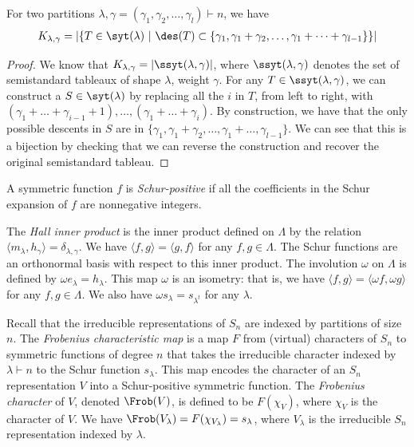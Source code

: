  \begin{prop}
     For two partitions $\lambda,\gamma = (\gamma_1,\gamma_2,\dots, \gamma_l)\vdash n$, we have
      \begin{align}\label{eq: kostka numb}
     K_{\lambda,\gamma} = | \{T\in \syt(\lambda)  \ | \ \des(T) \subset \{\gamma_1,\gamma_1 + \gamma_2, \dots, \gamma_1 +\cdots + \gamma_{l-1}\} \} |
 \end{align}
 \end{prop}
 \begin{proof}
     We know that $K_{\lambda,\gamma} = | \ssyt(\lambda,\gamma)|$, where $\ssyt(\lambda,\gamma)$ denotes the set of semistandard tableaux of shape $\lambda$, weight $\gamma$. For any $T\in \ssyt(\lambda,\gamma)$, we can construct a $S\in \syt(\lambda)$ by replacing all the $i$ in $T$, from left to right, with $(\gamma_1+\dots+\gamma_{i-1} +1),\dots,(\gamma_1+\dots+\gamma_{i})$. By construction, we have that the only possible descents in $S$ are in $\{\gamma_1,\gamma_1+\gamma_2,\dots, \gamma_1+\dots,\gamma_{l-1}\}$. We can see that this is a bijection by checking that we can reverse the construction and recover the original semistandard tableau.
 \end{proof}


A symmetric function $f$ is \textit{Schur-positive} if all the coefficients in the Schur expansion of $f$ are nonnegative integers. 

The \textit{Hall inner product} is the inner product defined on $\Lambda$ by the relation $\langle m_\lambda, h_\gamma\rangle = \delta_{\lambda,\gamma}$. We have $\langle f,g\rangle = \langle g,f\rangle$ for any $f,g\in \Lambda$.
The Schur functions are an orthonormal basis with respect to this inner product.
The involution $\omega$ on $\Lambda$ is defined by $\omega e_\lambda= h_\lambda$. This map $\omega$ is an isometry: that is, we have $\langle f,g\rangle = \langle \omega f,\omega g\rangle$ for any $f,g \in \Lambda$.
We also have $\omega s_\lambda = s_{\lambda^t}$ for any $\lambda$.


Recall that the irreducible representations of $S_n$ are indexed by partitions of size $n$.
The \textit{Frobenius characteristic map} is a map $F$ from (virtual) characters of $S_n$ to symmetric functions of degree $n$ that takes the irreducible character  indexed by $\lambda\vdash n$ to the Schur function $s_\lambda$. This map encodes the character of an $S_n$ representation $V$ into a Schur-positive symmetric function.
The \textit{Frobenius character} of $V$, denoted $\Frob(V)$, is defined to be $F(\chi_V)$, where $\chi_V$ is the character of $V$. We have $\Frob(V_\lambda) = F(\chi_{V_\lambda}) = s_\lambda$, where $V_\lambda$ is the irreducible $S_n$ representation indexed by $\lambda$.

